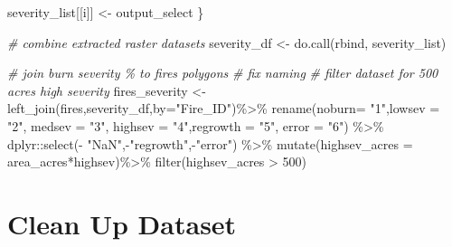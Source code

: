 \documentclass[
]{book}
\newenvironment{Shaded}{\begin{snugshade}}{\end{snugshade}}
\newcommand{\AttributeTok}[1]{\textcolor[rgb]{0.77,0.63,0.00}{#1}}
\newcommand{\CommentTok}[1]{\textcolor[rgb]{0.56,0.35,0.01}{\textit{#1}}}
\newcommand{\DecValTok}[1]{\textcolor[rgb]{0.00,0.00,0.81}{#1}}
\newcommand{\FunctionTok}[1]{\textcolor[rgb]{0.00,0.00,0.00}{#1}}
\newcommand{\NormalTok}[1]{#1}
\newcommand{\OtherTok}[1]{\textcolor[rgb]{0.56,0.35,0.01}{#1}}
\newcommand{\SpecialCharTok}[1]{\textcolor[rgb]{0.00,0.00,0.00}{#1}}
\newcommand{\StringTok}[1]{\textcolor[rgb]{0.31,0.60,0.02}{#1}}
\begin{document}
\begin{Shaded}
\begin{Highlighting}[]
\NormalTok{  severity\_list[[i]] }\OtherTok{\textless{}{-}}\NormalTok{ output\_select}
\NormalTok{\}}

\CommentTok{\# combine extracted raster datasets}
\NormalTok{severity\_df }\OtherTok{\textless{}{-}} \FunctionTok{do.call}\NormalTok{(rbind, severity\_list) }

\CommentTok{\# join burn severity \% to fires polygons}
\CommentTok{\# fix naming}
\CommentTok{\# filter dataset for 500 acres high severity}
\NormalTok{fires\_severity }\OtherTok{\textless{}{-}} \FunctionTok{left\_join}\NormalTok{(fires,severity\_df,}\AttributeTok{by=}\StringTok{"Fire\_ID"}\NormalTok{)}\SpecialCharTok{\%\textgreater{}\%} 
  \FunctionTok{rename}\NormalTok{(}\AttributeTok{noburn=} \StringTok{"1"}\NormalTok{,}\AttributeTok{lowsev =} \StringTok{"2"}\NormalTok{, }\AttributeTok{medsev =} \StringTok{"3"}\NormalTok{, }\AttributeTok{highsev =} \StringTok{"4"}\NormalTok{,}\AttributeTok{regrowth =} \StringTok{"5"}\NormalTok{, }\AttributeTok{error =} \StringTok{"6"}\NormalTok{) }\SpecialCharTok{\%\textgreater{}\%} 
\NormalTok{  dplyr}\SpecialCharTok{::}\FunctionTok{select}\NormalTok{(}\SpecialCharTok{{-}} \StringTok{"NaN"}\NormalTok{,}\SpecialCharTok{{-}}\StringTok{"regrowth"}\NormalTok{,}\SpecialCharTok{{-}}\StringTok{"error"}\NormalTok{) }\SpecialCharTok{\%\textgreater{}\%} 
  \FunctionTok{mutate}\NormalTok{(}\AttributeTok{highsev\_acres =}\NormalTok{ area\_acres}\SpecialCharTok{*}\NormalTok{highsev)}\SpecialCharTok{\%\textgreater{}\%} 
  \FunctionTok{filter}\NormalTok{(highsev\_acres }\SpecialCharTok{\textgreater{}} \DecValTok{500}\NormalTok{)}
\end{Highlighting}
\end{Shaded}

\hypertarget{clean-up-dataset}{%
\section{Clean Up Dataset}\label{clean-up-dataset}}
\end{document}

